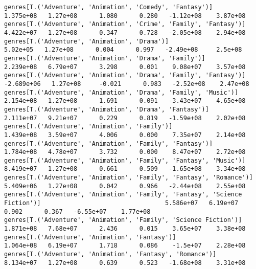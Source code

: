 \documentclass[11pt]{article}
\begin{document}
\begin{Verbatim}[commandchars=\\\{\}]
genres[T.('Adventure', 'Animation', 'Comedy', 'Fantasy')]                                                     1.375e+08   1.27e+08      1.080      0.280   -1.12e+08    3.87e+08
genres[T.('Adventure', 'Animation', 'Crime', 'Family', 'Fantasy')]                                            4.422e+07   1.27e+08      0.347      0.728   -2.05e+08    2.94e+08
genres[T.('Adventure', 'Animation', 'Drama')]                                                                  5.02e+05   1.27e+08      0.004      0.997   -2.49e+08     2.5e+08
genres[T.('Adventure', 'Animation', 'Drama', 'Family')]                                                       2.239e+08   6.79e+07      3.298      0.001    9.08e+07    3.57e+08
genres[T.('Adventure', 'Animation', 'Drama', 'Family', 'Fantasy')]                                           -2.689e+06   1.27e+08     -0.021      0.983   -2.52e+08    2.47e+08
genres[T.('Adventure', 'Animation', 'Drama', 'Family', 'Music')]                                              2.154e+08   1.27e+08      1.691      0.091   -3.43e+07    4.65e+08
genres[T.('Adventure', 'Animation', 'Drama', 'Fantasy')]                                                      2.111e+07   9.21e+07      0.229      0.819   -1.59e+08    2.02e+08
genres[T.('Adventure', 'Animation', 'Family')]                                                                1.439e+08   3.59e+07      4.006      0.000    7.35e+07    2.14e+08
genres[T.('Adventure', 'Animation', 'Family', 'Fantasy')]                                                     1.784e+08   4.78e+07      3.732      0.000    8.47e+07    2.72e+08
genres[T.('Adventure', 'Animation', 'Family', 'Fantasy', 'Music')]                                            8.419e+07   1.27e+08      0.661      0.509   -1.65e+08    3.34e+08
genres[T.('Adventure', 'Animation', 'Family', 'Fantasy', 'Romance')]                                          5.409e+06   1.27e+08      0.042      0.966   -2.44e+08    2.55e+08
genres[T.('Adventure', 'Animation', 'Family', 'Fantasy', 'Science Fiction')]                                  5.586e+07   6.19e+07      0.902      0.367   -6.55e+07    1.77e+08
genres[T.('Adventure', 'Animation', 'Family', 'Science Fiction')]                                             1.871e+08   7.68e+07      2.436      0.015    3.65e+07    3.38e+08
genres[T.('Adventure', 'Animation', 'Fantasy')]                                                               1.064e+08   6.19e+07      1.718      0.086    -1.5e+07    2.28e+08
genres[T.('Adventure', 'Animation', 'Fantasy', 'Romance')]                                                    8.134e+07   1.27e+08      0.639      0.523   -1.68e+08    3.31e+08

\end{Verbatim}
\end{document}
